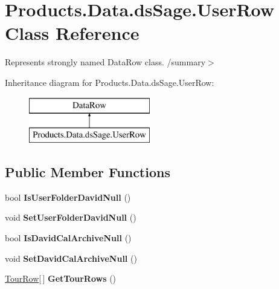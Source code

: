 \hypertarget{class_products_1_1_data_1_1ds_sage_1_1_user_row}{}\section{Products.\+Data.\+ds\+Sage.\+User\+Row Class Reference}
\label{class_products_1_1_data_1_1ds_sage_1_1_user_row}


Represents strongly named Data\+Row class. /summary$>$  


Inheritance diagram for Products.\+Data.\+ds\+Sage.\+User\+Row\+:\begin{figure}[H]
\begin{center}
\leavevmode
\includegraphics[height=2.000000cm]{class_products_1_1_data_1_1ds_sage_1_1_user_row}
\end{center}
\end{figure}
\subsection*{Public Member Functions}
\begin{DoxyCompactItemize}
\item 
bool {\bfseries Is\+User\+Folder\+David\+Null} ()\hypertarget{class_products_1_1_data_1_1ds_sage_1_1_user_row_a9ab390dfd791142b2a45349074533d00}{}\label{class_products_1_1_data_1_1ds_sage_1_1_user_row_a9ab390dfd791142b2a45349074533d00}

\item 
void {\bfseries Set\+User\+Folder\+David\+Null} ()\hypertarget{class_products_1_1_data_1_1ds_sage_1_1_user_row_a7628290eefc6e11a52b12081e84d1647}{}\label{class_products_1_1_data_1_1ds_sage_1_1_user_row_a7628290eefc6e11a52b12081e84d1647}

\item 
bool {\bfseries Is\+David\+Cal\+Archive\+Null} ()\hypertarget{class_products_1_1_data_1_1ds_sage_1_1_user_row_acf37799e918da0a7cf46dd34f4d7d4bd}{}\label{class_products_1_1_data_1_1ds_sage_1_1_user_row_acf37799e918da0a7cf46dd34f4d7d4bd}

\item 
void {\bfseries Set\+David\+Cal\+Archive\+Null} ()\hypertarget{class_products_1_1_data_1_1ds_sage_1_1_user_row_ab18525c4fd74b1bdfafdcdb90aa2dd38}{}\label{class_products_1_1_data_1_1ds_sage_1_1_user_row_ab18525c4fd74b1bdfafdcdb90aa2dd38}

\item 
\hyperlink{class_products_1_1_data_1_1ds_sage_1_1_tour_row}{Tour\+Row}\mbox{[}$\,$\mbox{]} {\bfseries Get\+Tour\+Rows} ()\hypertarget{class_products_1_1_data_1_1ds_sage_1_1_user_row_a7a8f1cea3959837f2a81ca45de17e923}{}\label{class_products_1_1_data_1_1ds_sage_1_1_user_row_a7a8f1cea3959837f2a81ca45de17e923}

\end{DoxyCompactItemize}
